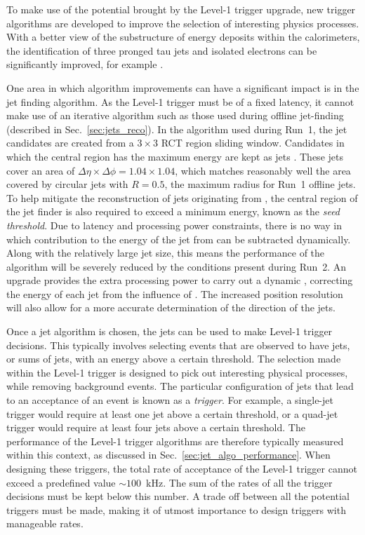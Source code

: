 To make use of the potential brought by the Level-1 trigger upgrade,
new trigger algorithms are developed to improve the selection of
interesting physics processes. With a better view of the substructure
of energy deposits within the calorimeters, the identification of three
pronged tau jets and isolated electrons can be significantly improved,
for example \cite{egllr,taullr}. 

One area in which algorithm improvements can have a significant impact
is in the jet finding algorithm. As the Level-1 trigger must be of a
fixed latency, it cannot make use of an iterative algorithm such as
those used during offline jet-finding (described in
Sec.~\ref{sec:jets_reco}). In the algorithm used during Run~1, the jet
candidates are created from a $3\times3$ \ac{RCT} region sliding
window.  Candidates in which the central region has the maximum energy
are kept as jets \cite{Chatrchyan:2008aa}. These jets cover an area of
$\Delta\eta\times\Delta\phi = 1.04 \times 1.04$, which matches
reasonably well the area covered by circular jets with $R=0.5$, the
maximum radius for Run~1 offline jets.  To help mitigate the
reconstruction of jets originating from \PU, the central region of the
jet finder is also required to exceed a minimum energy, known as the
\emph{seed threshold}. Due to latency and processing power
constraints, there is no way in which contribution to the energy of
the jet from \PU can be subtracted dynamically. Along with the relatively
large jet size, this means the performance of the algorithm will be
severely reduced by the conditions present during Run~2. An upgrade
provides the extra processing power to carry out a dynamic \PUS,
correcting the energy of each jet from the influence of \PU. The
increased position resolution will also allow for a more accurate
determination of the direction of the jets.

Once a jet algorithm is chosen, the jets can be used to make Level-1
trigger decisions. This typically involves selecting events that are
observed to have jets, or sums of jets, with an energy above a certain
threshold. The selection made within the Level-1 trigger is
designed to pick out interesting physical processes, while removing
background events. The particular configuration of jets that lead
to an acceptance of an event is known as a \emph{trigger}. For
example, a single-jet trigger would require at least one jet above a
certain \pT threshold, or a quad-jet trigger would require at least
four jets above a certain threshold. The performance of the Level-1
trigger algorithms are therefore typically measured within this
context, as discussed in Sec.~\ref{sec:jet_algo_performance}.  When
designing these triggers, the total rate of acceptance of the Level-1
trigger cannot exceed a predefined value $\sim 100$~kHz. The sum of
the rates of all the trigger decisions must be kept below this number.
A trade off between all the potential triggers must be made, making it
of utmost importance to design triggers with manageable rates.

